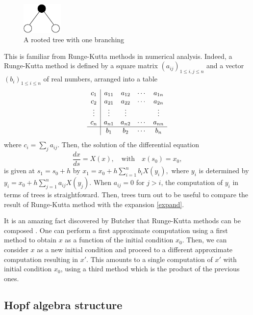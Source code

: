 \documentclass[12pt,here,feynmf]{article}
\begin{document}
\begin{figure}
\begin{center}
\includegraphics[width=2cm]{t3.pdf}
\caption{A rooted tree with one branching}
\label{treeexample}
\end{center}
\end{figure}



This is familiar from Runge-Kutta methods in numerical analysis. Indeed, a Runge-Kutta method is defined by a square matrix $(a_{ij})_{1\leq i,j\leq n}$ and a vector $(b_{i})_{1\leq i\leq n}$ of real numbers, arranged into a table
\begin{equation}
\begin{array}{c|cccc} 
c_{1}&a_{11}&a_{12}&\cdots&a_{1n}\cr
c_{2}&a_{21}&a_{22}&\cdots&a_{2n}\cr
\vdots&\vdots&\vdots&&\vdots\cr
c_{n}&a_{n1}&a_{n2}&\cdots&a_{nn}\cr
\hline
&b_{1}&b_{2}&\cdots&b_{n}
\end{array}
\label{RK}
\end{equation}
where $c_{i}=\sum_{j}a_{ij}$.  Then, the solution of the differential equation
\begin{equation}
\frac{dx}{ds}=X(x),\quad\mathrm{with}\quad x(s_{0})=x_{0},\label{diffeqRK}
\end{equation}
is given at $s_{1}=s_{0}+h$ by
$
x_{1}=x_{0}+h\sum_{i=1}^{n}b_{i}X(y_{i}),
$
where $y_{i}$ is determined by
$
y_{i}=x_{0}+h\sum_{j=1}^{n}a_{ij}X(y_{j}).
$
When $a_{ij}=0$ for $j>i$, the computation of $y_{i}$ in terms of trees is straightfoward. Then, trees turn out to be useful to compare the result of Runge-Kutta method with the expansion  \eqref{expand}. 


It is an amazing fact discovered by Butcher that Runge-Kutta methods can be composed \cite{butcher}. One can perform a first approximate computation using a first method to obtain $x$ as a function of the initial condition $x_{0}$.   Then, we can consider $x$ as a new initial condition and proceed to a different approximate computation resulting in $x'$. This amounts to a single computation of $x'$ with initial condition $x_{0}$, using a third method which is the product of the previous ones. 


\subsection{Hopf algebra structure}
\end{document}

